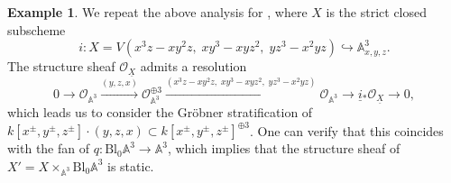 \documentclass[11pt]{amsart}
\theoremstyle{definition}
\theoremstyle{definition}
\newtheorem{example}[theorem]{Example}
\newcommand{\cO}{\mathcal{O}}
\newcommand{\ul}[1]{\underline{#1}}
\newcommand{\cal}{\mathcal}
\def\cO{{\cal O}}
\begin{document}
\begin{example}\label{example: statification of structure sheaf 2}
    We repeat the above analysis for \cite[Example 6.8]{molcho2023remarks}, where $X$ is the strict closed subscheme $$i\colon X = V(x^3 z - x y^2 z,\; x y^3 - x y z^2,\; y z^3 - x^2 y z)\hookrightarrow \mathbb{A}^3_{x,y,z}.$$ The structure sheaf $\cO_{\ul{X}}$ admits a resolution
$$
0 \longrightarrow \cO_{\mathbb{A}^3}
\xrightarrow{(y,z,x)}
\cO_{\mathbb{A}^3}^{\oplus 3}
\xrightarrow{(x^{3}z - x y^{2}z ,\; x y^{3} - x y z^{2} ,\; y z^{3} - x^{2} y z)}
\cO_{\mathbb{A}^3} \longrightarrow \ul{i}{}_*\cO_{\ul{X}} \longrightarrow 0,
$$
which leads us to consider the Gröbner stratification of $k[x^{\pm},y^{\pm},z^{\pm}]\cdot (y,z,x)\subset k[x^{\pm},y^{\pm},z^{\pm}]^{\oplus 3}$. One can verify that this coincides with the fan of $q\colon\text{Bl}_0\mathbb{A}^3\rightarrow \mathbb{A}^3$, which implies that the structure sheaf of $X' = X\times_{\mathbb{A}^3}\text{Bl}_0\mathbb{A}^3$ is static.
\end{example}
%
%
%
%
%
\end{document}
